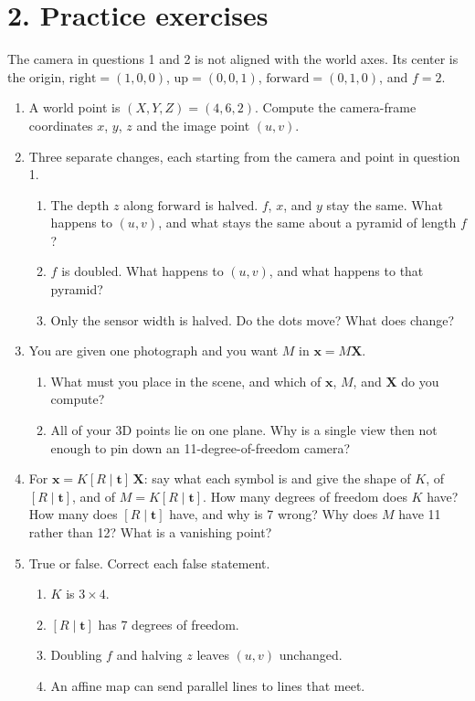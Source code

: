 \documentclass[11pt]{article}
\begin{document}
\section*{2. Practice exercises}

The camera in questions 1 and 2 is not aligned with the world axes. Its center is the origin, $\mathrm{right}=(1,0,0)$, $\mathrm{up}=(0,0,1)$, $\mathrm{forward}=(0,1,0)$, and $f=2$.

\begin{enumerate}
\item A world point is $(X,Y,Z)=(4,6,2)$. Compute the camera-frame coordinates $x$, $y$, $z$ and the image point $(u,v)$.

\item Three separate changes, each starting from the camera and point in question 1.
\begin{enumerate}
\item The depth $z$ along $\mathrm{forward}$ is halved. $f$, $x$, and $y$ stay the same. What happens to $(u,v)$, and what stays the same about a pyramid of length $f$?
\item $f$ is doubled. What happens to $(u,v)$, and what happens to that pyramid?
\item Only the sensor width is halved. Do the dots move? What does change?
\end{enumerate}

\item You are given one photograph and you want $M$ in $\mathbf{x}=M\mathbf{X}$.
\begin{enumerate}
\item What must you place in the scene, and which of $\mathbf{x}$, $M$, and $\mathbf{X}$ do you compute?
\item All of your 3D points lie on one plane. Why is a single view then not enough to pin down an 11-degree-of-freedom camera?
\end{enumerate}

\item For $\mathbf{x}=K[R\mid\mathbf{t}]\,\mathbf{X}$: say what each symbol is and give the shape of $K$, of $[R\mid\mathbf{t}]$, and of $M=K[R\mid\mathbf{t}]$. How many degrees of freedom does $K$ have? How many does $[R\mid\mathbf{t}]$ have, and why is 7 wrong? Why does $M$ have 11 rather than 12? What is a vanishing point?

\item True or false. Correct each false statement.
\begin{enumerate}
\item $K$ is $3\times 4$.
\item $[R\mid\mathbf{t}]$ has 7 degrees of freedom.
\item Doubling $f$ and halving $z$ leaves $(u,v)$ unchanged.
\item An affine map can send parallel lines to lines that meet.
\end{enumerate}


\end{enumerate}
\end{document}
